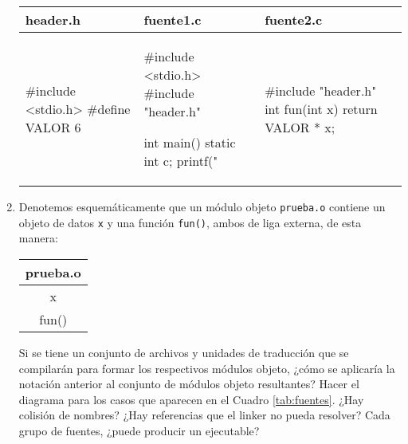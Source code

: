 \begin{enumerate}
\begin{tabular}{p{4cm}|p{5cm}|p{4cm}}
\hline
header.h & fuente1.c &fuente2.c\\
\hline
\begin{codecell}
#include <stdio.h>
#define VALOR 6
\end{codecell}
&
\begin{codecell}
#include <stdio.h>
#include "header.h"

int main()
{
	static int c;
	printf("%
}
\end{codecell}
&
\begin{codecell}
#include "header.h"
int fun(int x)
{
	return VALOR * x;
}
\end{codecell}
\\
\end{tabular}

\item Denotemos esquemáticamente que un módulo objeto \lstinline{prueba.o} contiene un objeto de datos
\lstinline{x} y una función \lstinline{fun()}, ambos de liga externa, de esta manera:


\begin{tabular}{|c|}
\hline
prueba.o\\
\hline
x\\
fun()\\
\hline
\end{tabular}

Si se tiene un conjunto de archivos y unidades de traducción que se compilarán para formar los
respectivos módulos objeto, ¿cómo se aplicaría la notación anterior al conjunto de módulos objeto
resultantes? Hacer el diagrama para los casos que aparecen en el Cuadro \ref{tab:fuentes}. ¿Hay colisión de nombres? ¿Hay referencias que el linker no pueda resolver? Cada grupo de fuentes, ¿puede producir un ejecutable?


\end{enumerate}
